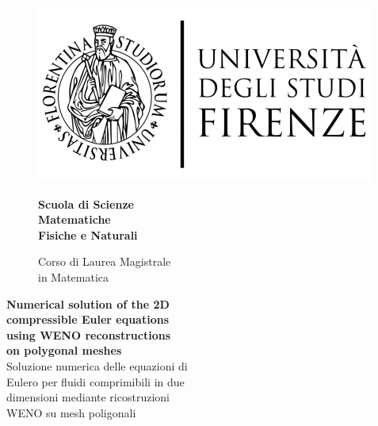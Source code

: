 \begin{titlepage}
\begin{figure}[htbp]
\begin{minipage}{0.3\textwidth}
\includegraphics[scale=1.1]{figures/logo.pdf}
\end{minipage}
%
\hfill
%
\begin{minipage}{0.4\textwidth}
\centering
\begin{flushright}
	{\Large \textbf{Scuola di Scienze\\ Matematiche\\ Fisiche e Naturali\\}}
\end{flushright}
\begin{flushright}
	Corso di Laurea Magistrale\\ in Matematica
\end{flushright}
\end{minipage}
%
\end{figure}
\vspace{20mm}
\begin{center}
	{\Huge \textbf{Numerical solution of the 2D\\ compressible Euler equations\\
	using WENO reconstructions\\ on polygonal meshes\\}}
	\vspace{10mm}
	{\huge Soluzione numerica delle equazioni di\\ Eulero
	per fluidi comprimibili in due\\ dimensioni
	mediante ricostruzioni\\ WENO su mesh poligonali\\}
\end{center}
\vspace{25mm}
\vfill
{}

\end{titlepage}
\newpage
\restoregeometry